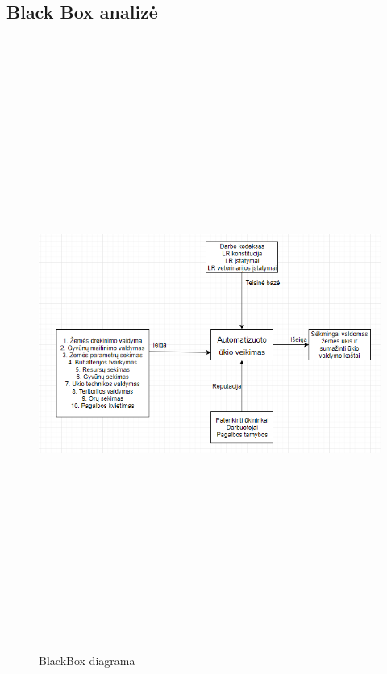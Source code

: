 \documentclass[oneside]{VUMIFPSkursinis}
\begin{document}
	\subsection{Black Box analizė}
\begin{figure}[H]
		\centering	
	\includegraphics[width=18cm,height=20cm,keepaspectratio]{BlackBox.png}
	\caption{BlackBox diagrama}
	\label{fig:BlackBox}
\end{figure}
\end{document}
